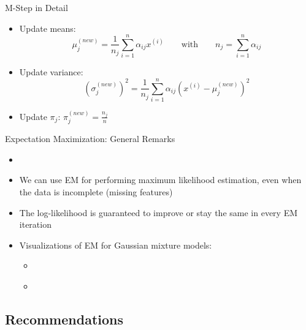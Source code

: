 \begin{frame}{M-Step in Detail}{}\important
	\begin{itemize}
		\item Update means:
		\begin{equation}
			\mu_j^{(new)} = \frac{1}{n_j} \sum_{i=1}^n \alpha_{ij} x^{(i)} \qquad\text{with}\qquad n_j = \sum_{i=1}^n \alpha_{ij}
		\end{equation}
		\item Update variance:
		\begin{equation}
			(\sigma_j^{(new)})^2 = \frac{1}{n_j} \sum_{i=1}^n \alpha_{ij} (x^{(i)} - \mu_j^{(new)})^2
		\end{equation}
		\item Update $\pi_j$: $\pi_j^{(new)} = \frac{n_j}{n}$
	\end{itemize}
\end{frame}


\begin{frame}{Expectation Maximization: General Remarks}{}
	\begin{itemize}
		\item {}
		\item We can use EM for performing maximum likelihood estimation, even when the data is incomplete (missing features)
		\item The log-likelihood is guaranteed to improve or stay the same in every EM iteration 
		\item Visualizations of EM for Gaussian mixture models:
		\begin{itemize}
			\item \href{https://www.youtube.com/watch?v=l1W3BvjJnmY}{}
			\item \href{https://youtu.be/eXdGCO-2n90?t=2}{}
		\end{itemize}
	\end{itemize}
\end{frame}


\subsection{Recommendations}

